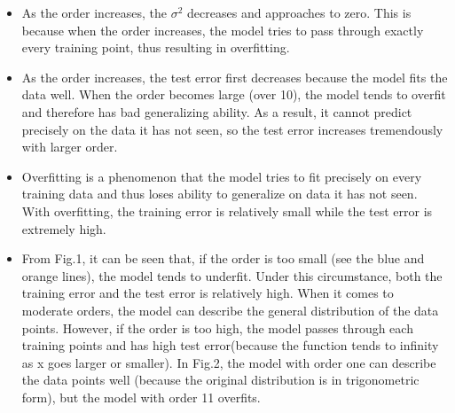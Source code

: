 \documentclass[a4paper]{article}
\begin{document}
\begin{itemize}
    \item{As the order increases, the $\sigma^2$ decreases and approaches to zero. This is because when the order increases, the model tries to pass through exactly every training point, thus resulting in overfitting.}
    \item{As the order increases, the test error first decreases because the model fits the data well. When the order becomes large (over 10), the model tends to overfit and therefore has bad generalizing ability. As a result, it cannot predict precisely on the data it has not seen, so the test error increases tremendously with larger order.}
    \item{Overfitting is a phenomenon that the model tries to fit precisely on every training data and thus loses ability to generalize on data it has not seen. With overfitting, the training error is relatively small while the test error is extremely high.}
    \item{From Fig.1, it can be seen that, if the order is too small (see the blue and orange lines), the model tends to underfit. Under this circumstance, both the training error and the test error is relatively high. When it comes to moderate orders, the model can describe the general distribution of the data points. However, if the order is too high, the model passes through each training points and has high test error(because the function tends to infinity as x goes larger or smaller). In Fig.2, the model with order one can describe the data points well (because the original distribution is in trigonometric form), but the model with order 11 overfits.}
\end{itemize}
\end{document}
